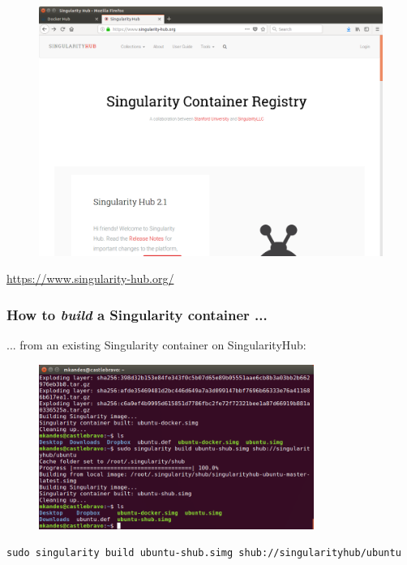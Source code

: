 \documentclass{beamer}
\begin{document}
\begin{frame}
   \frametitle{}
   \begin{figure}[htbp]
      \includegraphics[width=1.0\textwidth]{images/singularity-hub-homepage.png}
   \end{figure}
   \begin{center}
      \url{https://www.singularity-hub.org/}
   \end{center}
\end{frame}

\begin{frame}
   \frametitle{How to \textit{build} a Singularity container ...}
   ... from an existing Singularity container on SingularityHub:
   \begin{figure}[htbp]
      \includegraphics[width=0.8\textwidth]{images/singularity-build-shub.png}
   \end{figure}
   \lstinline{sudo singularity build ubuntu-shub.simg shub://singularityhub/ubuntu}
\end{frame}
\end{document}
